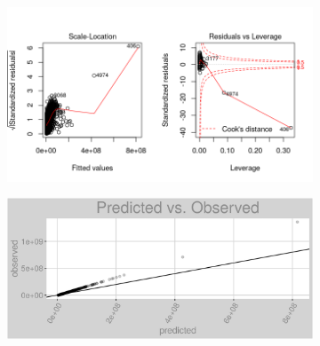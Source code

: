 \begin{figure}[h]
\begin{subfigure}{1\textwidth}
\includegraphics[width=.99\textwidth, height=0.475\textheight]{Images/electricity_pls_res_2.png}
\centering
\end{subfigure}
\begin{subfigure}{1\textwidth}
\includegraphics[width=.99\textwidth, height=0.3\textheight]{Images/electricity_pls_pvo.png}
\centering
\end{subfigure}
\end{figure}
\newpage
